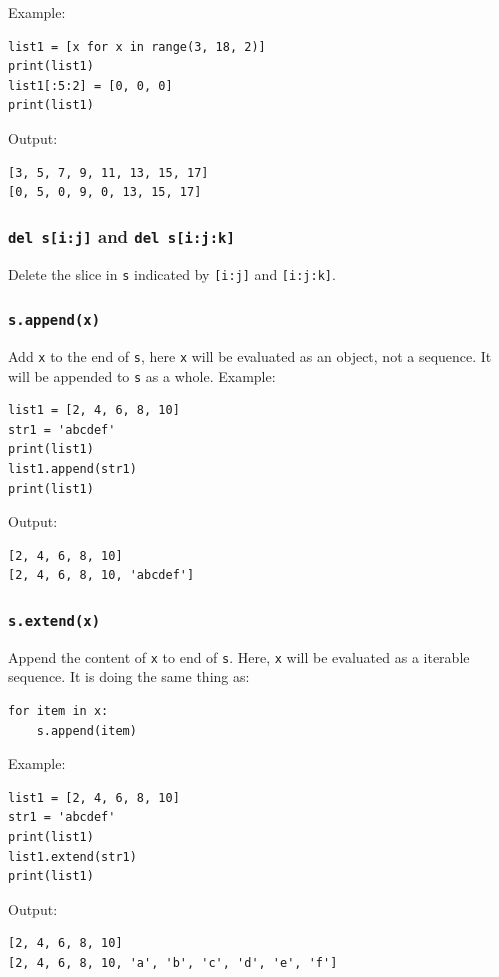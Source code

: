 \documentclass[12pt]{book}
\begin{document}
Example:
\begin{verbatim}
list1 = [x for x in range(3, 18, 2)]
print(list1)
list1[:5:2] = [0, 0, 0]
print(list1)
\end{verbatim}
Output:
\begin{verbatim}
[3, 5, 7, 9, 11, 13, 15, 17]
[0, 5, 0, 9, 0, 13, 15, 17]
\end{verbatim}

\subsubsection{\texttt{del s[i:j]} and \texttt{del s[i:j:k]}}
\label{sec:orgbeb7bad}
Delete the slice in \texttt{s} indicated by \texttt{[i:j]} and \texttt{[i:j:k]}.
\subsubsection{\texttt{s.append(x)}}
\label{sec:org0e31076}
Add \texttt{x} to the end of \texttt{s}, here \texttt{x} will be evaluated as an object, not a sequence. It will be appended to \texttt{s} as a whole. Example:
\begin{verbatim}
list1 = [2, 4, 6, 8, 10]
str1 = 'abcdef'
print(list1)
list1.append(str1)
print(list1)
\end{verbatim}
Output:
\begin{verbatim}
[2, 4, 6, 8, 10]
[2, 4, 6, 8, 10, 'abcdef']
\end{verbatim}

\subsubsection{\texttt{s.extend(x)}}
\label{sec:orgcce30c8}
Append the content of \texttt{x} to end of \texttt{s}. Here, \texttt{x} will be evaluated as a iterable sequence. It is doing the same thing as:
\begin{verbatim}
for item in x:
    s.append(item)
\end{verbatim}
Example:
\begin{verbatim}
list1 = [2, 4, 6, 8, 10]
str1 = 'abcdef'
print(list1)
list1.extend(str1)
print(list1)
\end{verbatim}
Output:
\begin{verbatim}
[2, 4, 6, 8, 10]
[2, 4, 6, 8, 10, 'a', 'b', 'c', 'd', 'e', 'f']
\end{verbatim}
\end{document}
